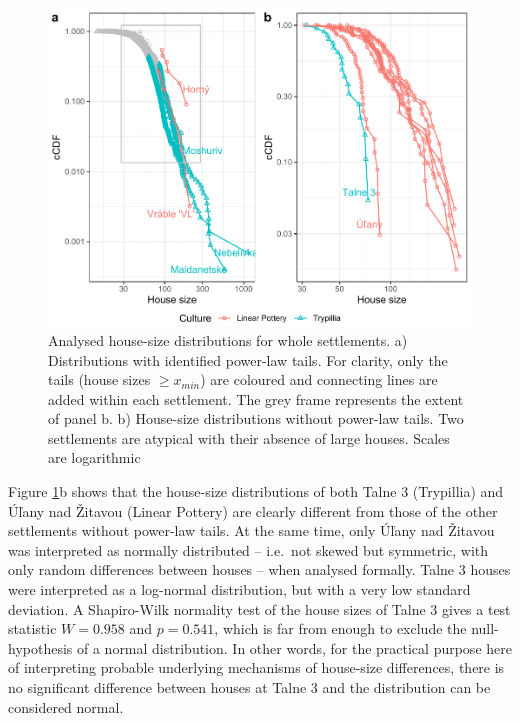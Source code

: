 \documentclass[
  12pt,
]{book}
\begin{document}
\begin{figure}

{\centering \includegraphics[width=0.9\linewidth]{bookdown-demo_files/figure-latex/06-settle-tails-1} 

}

\caption{Analysed house-size distributions for whole settlements. a) Distributions with identified power-law tails. For clarity, only the tails (house sizes \(\geq x_{min}\)) are coloured and connecting lines are added within each settlement. The grey frame represents the extent of panel b. b) House-size distributions without power-law tails. Two settlements are atypical with their absence of large houses. Scales are logarithmic}\label{fig:06-settle-tails}
\end{figure}

Figure \ref{fig:06-settle-tails}b shows that the house-size distributions of both Talne 3 (Trypillia) and Úľany nad Žitavou (Linear Pottery) are clearly different from those of the other settlements without power-law tails. At the same time, only Úľany nad Žitavou was interpreted as normally distributed -- i.e.~not skewed but symmetric, with only random differences between houses -- when analysed formally. Talne 3 houses were interpreted as a log-normal distribution, but with a very low standard deviation. A Shapiro-Wilk normality test of the house sizes of Talne 3 gives a test statistic \(W = 0.958\) and \(p = 0.541\), which is far from enough to exclude the null-hypothesis of a normal distribution. In other words, for the practical purpose here of interpreting probable underlying mechanisms of house-size differences, there is no significant difference between houses at Talne 3 and the distribution can be considered normal.
\end{document}
